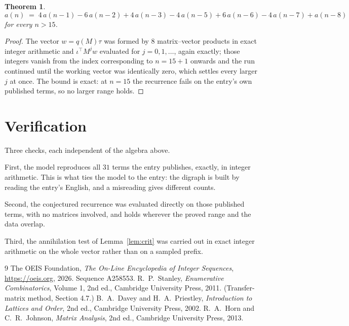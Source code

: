 \documentclass[11pt,a4paper]{article}
\theoremstyle{plain}
\newtheorem{theorem}{Theorem}
\theoremstyle{definition}
\begin{document}
\begin{theorem}
\[
a(n)\;=\;4\,a(n-1) - 6\,a(n-2) + 4\,a(n-3) - 4\,a(n-5) + 6\,a(n-6) - 4\,a(n-7) + a(n-8)
\]
for every $n>15$.
\end{theorem}

\begin{proof}
The vector $w=q(M)\tau$ was formed by $8$ matrix--vector products in exact integer
arithmetic and $\iota^{\!\top}M^{j}w$ evaluated for $j=0,1,\dots$, again exactly; those
integers vanish from the index corresponding to $n=15+1$ onwards and the run continued
until the working vector was identically zero, which settles every larger $j$ at once. The bound is exact: at $n=15$ the recurrence fails on the entry's own published terms, so no larger range holds.
\end{proof}

\section{Verification}

Three checks, each independent of the algebra above.

First, the model reproduces all $31$ terms the entry publishes, exactly, in integer
arithmetic. This is what ties the model to the entry: the digraph is built by reading the
entry's English, and a misreading gives different counts.

Second, the conjectured recurrence was evaluated directly on those published terms, with no
matrices involved, and holds wherever the proved range and the data overlap.

Third, the annihilation test of Lemma~\ref{lem:crit} was carried out in exact integer
arithmetic on the whole vector rather than on a sampled prefix.

\begin{thebibliography}{9}
 The OEIS Foundation, \emph{The On-Line Encyclopedia of Integer
Sequences}, \url{https://oeis.org}, 2026. Sequence A258553.
 R.~P.~Stanley, \emph{Enumerative Combinatorics}, Volume 1, 2nd ed.,
Cambridge University Press, 2011. (Transfer-matrix method, Section 4.7.)
 B.~A.~Davey and H.~A.~Priestley, \emph{Introduction to Lattices and
Order}, 2nd ed., Cambridge University Press, 2002.
 R.~A.~Horn and C.~R.~Johnson, \emph{Matrix Analysis}, 2nd ed., Cambridge
University Press, 2013.
\end{thebibliography}
\end{document}

